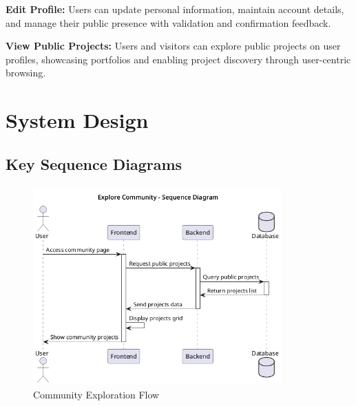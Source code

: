 \textbf{Edit Profile:} Users can update personal information, maintain account details, and manage their public presence with validation and confirmation feedback.

\textbf{View Public Projects:} Users and visitors can explore public projects on user profiles, showcasing portfolios and enabling project discovery through user-centric browsing.

\section{System Design}

\subsection{Key Sequence Diagrams}

\begin{figure}[H]
\centering
\includegraphics[width=0.85\textwidth]{conception/SprintV/sequence_diagrams/sequence_communityInteraction_6_1_ExploreCommunityAsUser.png}
\caption{Community Exploration Flow}
\label{fig:seq_explore_community}
\end{figure}

